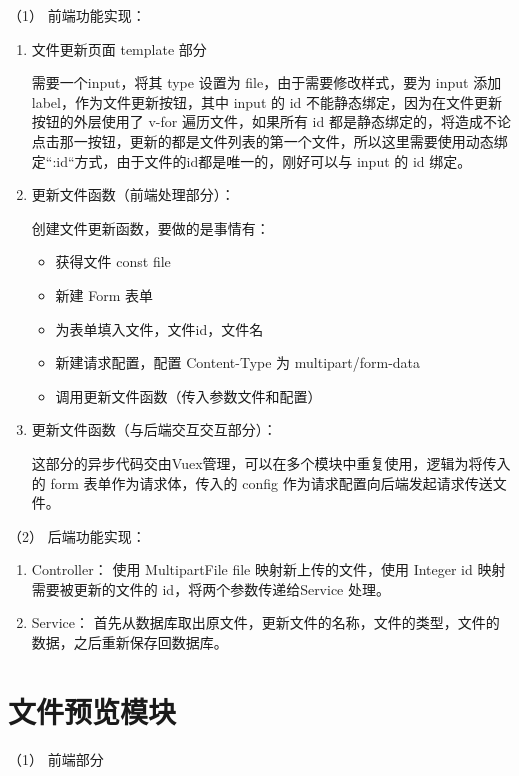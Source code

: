 （1） 前端功能实现：
\begin{enumerate}[label=\circled{\arabic*}]
  \item 文件更新页面 template 部分

        需要一个input，将其 type 设置为 file，由于需要修改样式，要为 input 添加 label，作为文件更新按钮，其中 input 的 id 不能静态绑定，因为在文件更新按钮的外层使用了 v-for 遍历文件，如果所有 id 都是静态绑定的，将造成不论点击那一按钮，更新的都是文件列表的第一个文件，所以这里需要使用动态绑定“:id“方式，由于文件的id都是唯一的，刚好可以与 input 的 id 绑定。
  \item 更新文件函数（前端处理部分）：

        创建文件更新函数，要做的是事情有：
        \begin{itemize}
          \item 获得文件 const file
          \item 新建 Form 表单
          \item 为表单填入文件，文件id，文件名
          \item 新建请求配置，配置 Content-Type 为 multipart/form-data
          \item 调用更新文件函数（传入参数文件和配置）
        \end{itemize}
  \item 更新文件函数（与后端交互交互部分）：

        这部分的异步代码交由Vuex管理，可以在多个模块中重复使用，逻辑为将传入的 form 表单作为请求体，传入的 config 作为请求配置向后端发起请求传送文件。
\end{enumerate}
（2） 后端功能实现：
\begin{enumerate}[label=\circled{\arabic*}]
  \item Controller：
        使用 MultipartFile file 映射新上传的文件，使用 Integer id 映射需要被更新的文件的 id，将两个参数传递给Service 处理。
  \item Service：
        首先从数据库取出原文件，更新文件的名称，文件的类型，文件的数据，之后重新保存回数据库。
\end{enumerate}


\section{文件预览模块}

（1） 前端部分

